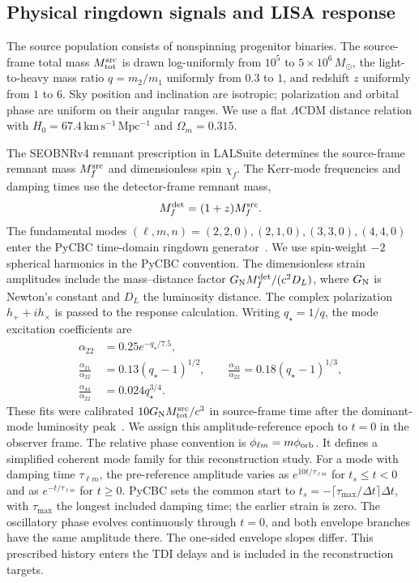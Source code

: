 \documentclass[10pt,prd,aps,a4paper,twocolumn,superscriptaddress,nofootinbib,floatfix]{revtex4-2}
\begin{document}
\subsection{Physical ringdown signals and LISA response}\label{sec:physical_signals}
The source population consists of nonspinning progenitor binaries. The source-frame total mass $M_{\rm tot}^{\rm src}$ is drawn log-uniformly from $10^5$ to $5\times10^6\,M_\odot$, the light-to-heavy mass ratio $q=m_2/m_1$ uniformly from $0.3$ to $1$, and redshift $z$ uniformly from $1$ to $6$. Sky position and inclination are isotropic; polarization and orbital phase are uniform on their angular ranges. We use a flat $\Lambda$CDM distance relation with $H_0=67.4\,\mathrm{km\,s^{-1}\,Mpc^{-1}}$ and $\Omega_m=0.315$.

The SEOBNRv4 remnant prescription in LALSuite determines the source-frame remnant mass $M_f^{\rm src}$ and dimensionless spin $\chi_f$. The Kerr-mode frequencies and damping times use the detector-frame remnant mass,
\begin{equation}
M_f^{\rm det}=(1+z)M_f^{\rm src}.
\end{equation}
The fundamental modes $(\ell,m,n)=(2,2,0),(2,1,0),(3,3,0),(4,4,0)$ enter the PyCBC time-domain ringdown generator~\cite{berti2006gravitational,berti2009qnm,PyCBCRingdown}. We use spin-weight $-2$ spherical harmonics in the PyCBC convention. The dimensionless strain amplitudes include the mass--distance factor $G_{\rm N}M_f^{\rm det}/(c^2D_L)$, where $G_{\rm N}$ is Newton's constant and $D_L$ the luminosity distance. The complex polarization $h_++ih_\times$ is passed to the response calculation. Writing $q_\star=1/q$, the mode excitation coefficients are~\cite{Kamaretsos2012}
\begin{align}
\alpha_{22}&=0.25e^{-q_\star/7.5},\nonumber\\
\frac{\alpha_{21}}{\alpha_{22}}&=0.13(q_\star-1)^{1/2},\qquad
\frac{\alpha_{33}}{\alpha_{22}}=0.18(q_\star-1)^{1/3},\nonumber\\
\frac{\alpha_{44}}{\alpha_{22}}&=0.024q_\star^{3/4}.
\end{align}
These fits were calibrated $10G_{\rm N}M_{\rm tot}^{\rm src}/c^3$ in source-frame time after the dominant-mode luminosity peak~\cite{Kamaretsos2012}. We assign this amplitude-reference epoch to $t=0$ in the observer frame. The relative phase convention is $\phi_{\ell m}=m\phi_{\rm orb}$. It defines a simplified coherent mode family for this reconstruction study. For a mode with damping time $\tau_{\ell m}$, the pre-reference amplitude varies as $e^{10t/\tau_{\ell m}}$ for $t_s\le t<0$ and as $e^{-t/\tau_{\ell m}}$ for $t\ge0$. PyCBC sets the common start to $t_s=-\lceil\tau_{\max}/\Delta t\rceil\Delta t$, with $\tau_{\max}$ the longest included damping time; the earlier strain is zero. The oscillatory phase evolves continuously through $t=0$, and both envelope branches have the same amplitude there. The one-sided envelope slopes differ. This prescribed history enters the TDI delays and is included in the reconstruction targets.
\end{document}
